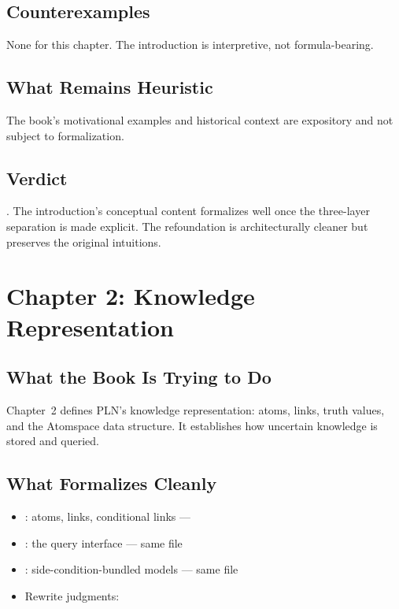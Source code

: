 \documentclass[11pt,openany]{report}
\begin{document}
\section{Counterexamples}

None for this chapter.  The introduction is interpretive, not
formula-bearing.

\section{What Remains Heuristic}

The book's motivational examples and historical context are expository
and not subject to formalization.

\section{Verdict}

\verdictClean{}.  The introduction's conceptual content formalizes well
once the three-layer separation is made explicit.  The refoundation is
architecturally cleaner but preserves the original intuitions.


\chapter{Chapter 2: Knowledge Representation}
\label{ch:review-ch2}

\section{What the Book Is Trying to Do}

Chapter~2 defines PLN's knowledge representation: atoms, links, truth
values, and the Atomspace data structure.  It establishes how uncertain
knowledge is stored and queried.

\section{What Formalizes Cleanly}

\begin{itemize}
\item {}: atoms, links, conditional links --- 
\item {}: the query interface --- same file
\item {}: side-condition-bundled models --- same file
\item Rewrite judgments: 
\end{itemize}
\end{document}
